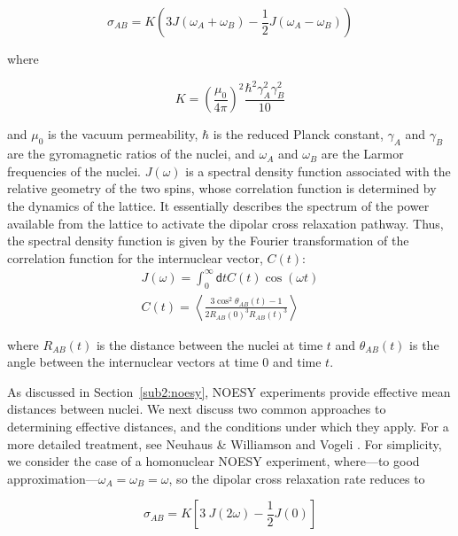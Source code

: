 \documentclass[9pt,review]{livecoms}
\begin{document}
\begin{equation}
\label{eqn:noe_cross_relaxation}
\sigma_{AB} = K \left( 3 J(\omega_A + \omega_B) - \frac {1} {2} J(\omega_A - \omega_B) \right)
\end{equation}

\noindent where

\begin{equation}
\label{eqn:noe_constant}
K = \left( \frac {\mu_0} {4 \pi} \right)^2 \frac {\hbar^2 \gamma_A^2 \gamma_B^2} {10}
\end{equation}

\noindent and $\mu_0$ is the vacuum permeability, $\hbar$ is the reduced Planck constant, $\gamma_A$ and $\gamma_B$ are the gyromagnetic ratios of the nuclei, and $\omega_A$ and $\omega_B$ are the Larmor frequencies of the nuclei.
$J(\omega)$ is a spectral density function associated with the relative geometry of the two spins, whose correlation function is determined by the dynamics of the lattice. It essentially describes the spectrum of the power available from the lattice to activate the dipolar cross relaxation pathway.
Thus, the spectral density function is given by the Fourier transformation of the correlation function for the internuclear vector, $C(t)$:
\begin{equation}
\label{eqn:noe_spectral_density}
\begin{gathered}
J(\omega) = \int_0^\infty \mathsf{d}t C(t) \cos (\omega t) \\
C(t) = \left \langle \frac {3 \cos^2 \theta_{AB}(t) - 1} {2 R_{AB}(0)^3 R_{AB}(t)^3} \right \rangle
\end{gathered}
\end{equation}

\noindent where $R_{AB}(t)$ is the distance between the nuclei at time $t$ and $\theta_{AB}(t)$ is the angle between the internuclear vectors at time $0$ and time $t$.

As discussed in Section~\ref{sub2:noesy}, NOESY experiments provide effective mean distances between nuclei.
We next discuss two common approaches to determining effective distances, and the conditions under which they apply.
For a more detailed treatment, see Neuhaus \& Williamson \cite{neuhaus_nuclear_2000} and Vogeli \cite{vogeli_nuclear_2014}.
For simplicity, we consider the case of a  homonuclear NOESY experiment, where---to good approximation---$\omega_A = \omega_B = \omega$, so the dipolar cross relaxation rate reduces to

\begin{equation}
\label{eqn:noe_homonuclear}
\sigma_{AB} = K \left[ 3\: J(2 \omega) - \frac {1} {2} J(0) \right]
\end{equation}
\end{document}
